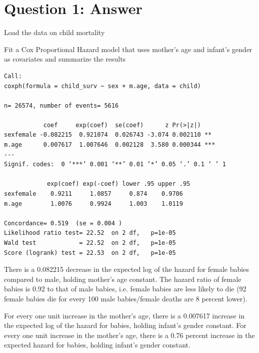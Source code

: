 \documentclass[12pt,letterpaper]{article}
\begin{document}
\newpage

\section*{Question 1: Answer}
\vspace{.5cm}

\noindent Load the data on child mortality



\noindent Fit a Cox Proportional Hazard model that uses mother's age and infant's gender as covariates and summarize the results 



\begin{verbatim}
Call:
coxph(formula = child_surv ~ sex + m.age, data = child)

n= 26574, number of events= 5616 

           coef     exp(coef)  se(coef)      z Pr(>|z|)    
sexfemale -0.082215  0.921074  0.026743 -3.074 0.002110 ** 
m.age      0.007617  1.007646  0.002128  3.580 0.000344 ***
---
Signif. codes:  0 ‘***’ 0.001 ‘**’ 0.01 ‘*’ 0.05 ‘.’ 0.1 ‘ ’ 1

            exp(coef) exp(-coef) lower .95 upper .95
sexfemale    0.9211     1.0857     0.874    0.9706
m.age        1.0076     0.9924     1.003    1.0119

Concordance= 0.519  (se = 0.004 )
Likelihood ratio test= 22.52  on 2 df,   p=1e-05
Wald test            = 22.52  on 2 df,   p=1e-05
Score (logrank) test = 22.53  on 2 df,   p=1e-05
\end{verbatim}

\noindent There is a 0.082215 decrease in the expected log of the hazard for female babies compared to male, holding mother's age constant. The hazard ratio of female babies is 0.92 to that of male babies, i.e. female babies are less likely to die (92 female babies die for every 100 male babies/female deaths are 8 percent lower).


\vspace{.5cm}

\noindent For every one unit increase in the mother's age, there is a 0.007617 increase in the expected log of the hazard for babies, holding infant's gender constant. For every one unit increase in the mother's age, there is a 0.76 percent increase in the expected hazard for babies, holding infant's gender constant.
\end{document}
